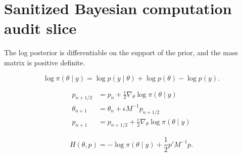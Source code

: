 \section{Sanitized Bayesian computation audit slice}

\newcommand{\logpost}{\log \pi(\theta \mid y)}

\begin{assumption}\label{assump:dept-hmc-regularity}
The log posterior is differentiable on the support of the prior, and the mass matrix is positive definite.
\end{assumption}

\begin{equation}\label{eq:dept-log-posterior}
\logpost = \log p(y\mid \theta) + \log p(\theta) - \log p(y).
\end{equation}

\begin{align}\label{eq:dept-hmc-leapfrog}
p_{n+1/2} &= p_n + \frac{\epsilon}{2}\nabla_\theta \logpost \\
\theta_{n+1} &= \theta_n + \epsilon M^{-1}p_{n+1/2} \\
p_{n+1} &= p_{n+1/2} + \frac{\epsilon}{2}\nabla_\theta \logpost
\end{align}

\begin{equation}\label{eq:dept-hmc-hamiltonian}
H(\theta,p)= -\logpost + \frac{1}{2}p'M^{-1}p.
\end{equation}
